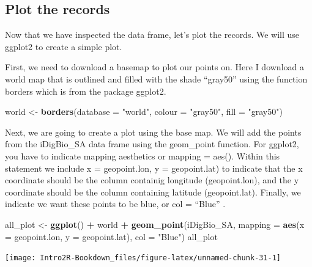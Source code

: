 \documentclass[
]{book}
\newenvironment{Shaded}{\begin{snugshade}}{\end{snugshade}}
\newcommand{\DataTypeTok}[1]{\textcolor[rgb]{0.13,0.29,0.53}{#1}}
\newcommand{\KeywordTok}[1]{\textcolor[rgb]{0.13,0.29,0.53}{\textbf{#1}}}
\newcommand{\NormalTok}[1]{#1}
\newcommand{\OperatorTok}[1]{\textcolor[rgb]{0.81,0.36,0.00}{\textbf{#1}}}
\newcommand{\StringTok}[1]{\textcolor[rgb]{0.31,0.60,0.02}{#1}}
\begin{document}
\hypertarget{plot-the-records}{%
\subsection*{Plot the records}\label{plot-the-records}}

Now that we have inspected the data frame, let's plot the records. We will use ggplot2 to create a simple plot.

First, we need to download a basemap to plot our points on. Here I download a world map that is outlined and filled with the shade ``gray50'' using the function borders which is from the package ggplot2.

\begin{Shaded}
\begin{Highlighting}[]
\NormalTok{world \textless{}{-}}\StringTok{ }\KeywordTok{borders}\NormalTok{(}\DataTypeTok{database =} \StringTok{"world"}\NormalTok{, }\DataTypeTok{colour =} \StringTok{"gray50"}\NormalTok{, }\DataTypeTok{fill =} \StringTok{"gray50"}\NormalTok{)}
\end{Highlighting}
\end{Shaded}

Next, we are going to create a plot using the base map. We will add the points from the iDigBio\_SA data frame using the geom\_point function. For ggplot2, you have to indicate mapping aesthetics or mapping = aes(). Within this statement we include x = geopoint.lon, y = geopoint.lat) to indicate that the x coordinate should be the column containig longitude (geopoint.lon), and the y coordinate should be the column containing latitude (geopoint.lat). Finally, we indicate we want these points to be blue, or col = ``Blue'' .

\begin{Shaded}
\begin{Highlighting}[]
\NormalTok{all\_plot \textless{}{-}}\StringTok{ }\KeywordTok{ggplot}\NormalTok{() }\OperatorTok{+}
\StringTok{            }\NormalTok{world }\OperatorTok{+}
\StringTok{            }\KeywordTok{geom\_point}\NormalTok{(iDigBio\_SA, }
                       \DataTypeTok{mapping =} \KeywordTok{aes}\NormalTok{(}\DataTypeTok{x =}\NormalTok{ geopoint.lon, }\DataTypeTok{y =}\NormalTok{ geopoint.lat), }
                       \DataTypeTok{col =} \StringTok{"Blue"}\NormalTok{)}
\NormalTok{all\_plot}
\end{Highlighting}
\end{Shaded}

\begin{center}\texttt{[image: Intro2R-Bookdown\_files/figure-latex/unnamed-chunk-31-1]} \end{center}
\end{document}
